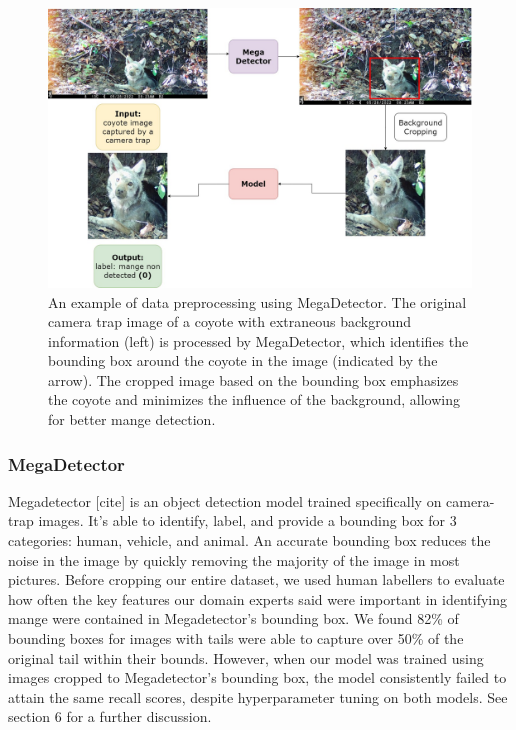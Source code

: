 \documentclass{article}
\begin{document}
\begin{figure}
\centering
\includegraphics[width=1.0\textwidth]{fig3.jpeg}
\caption{\label{fig:fig3}An example of data preprocessing using MegaDetector. The original camera trap image of a coyote with extraneous background information (left) is processed by MegaDetector, which identifies the bounding box around the coyote in the image (indicated by the arrow). The cropped image based on the bounding box emphasizes the coyote and minimizes the influence of the background, allowing for better mange detection.}
\end{figure}

\subsubsection{MegaDetector}
Megadetector [cite] is an object detection model trained specifically on camera-trap images. It’s able to identify, label, and provide a bounding box for 3 categories: human, vehicle, and animal. An accurate bounding box reduces the noise in the image by quickly removing the majority of the image in most pictures. Before cropping our entire dataset, we used human labellers to evaluate how often the key features our domain experts said were important in identifying mange were contained in Megadetector’s bounding box. We found 82\% of bounding boxes for images with tails were able to capture over 50\% of the original tail within their bounds. However, when our model was trained using images cropped to Megadetector’s bounding box, the model consistently failed to attain the same recall scores, despite hyperparameter tuning on both models. See section 6 for a further discussion.
\end{document}
